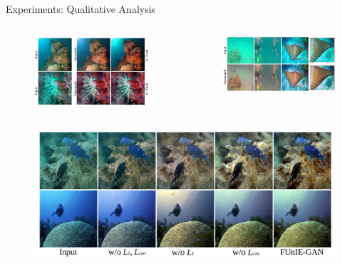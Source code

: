 \documentclass{cubeamer}
\begin{document}
\begin{frame}{Experiments: Qualitative Analysis}
    \begin{columns}
        \begin{column}{0.45\textwidth}
            \begin{figure}
                \centering
                \includegraphics[width=0.8\columnwidth]{figures/result-1.PNG}
            \end{figure}
        \end{column}
        \begin{column}{0.45\textwidth}
            \begin{figure}
                \centering
                \includegraphics[width=1.\columnwidth]{figures/result-2.PNG}
            \end{figure}
        \end{column}
    \end{columns}
    \begin{figure}
        \centering
        \includegraphics[width=0.5\columnwidth]{figures/result-3.PNG}
    \end{figure}
\end{frame}
\end{document}
